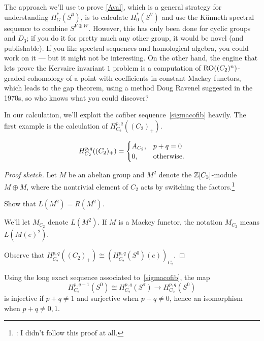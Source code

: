 The approach we'll use to prove \cref{Aval}, which is a general strategy for understanding $H_G^*(S^0)$, is to
calculate $H_0^*(S^V)$ and use the Künneth spectral sequence to combine
$S^{V\oplus W}$. However, this has only been done for cyclic groups and $D_3$; if you do it for pretty much any
other group, it would be novel (and publishable). If you like spectral sequences and homological algebra, you could
work on it --- but it might not be interesting. On the other hand, the engine that lets \cite{HHR} prove the
Kervaire invariant $1$ problem is a computation of $\mathrm{RO}((C_2)^n)$-graded cohomology of a point with coefficients in
constant Mackey functors, which leads to the gap theorem, using a method Doug Ravenel suggested in the 1970s, so
who knows what you could discover?

In our calculation, we'll exploit the cofiber sequence~\eqref{sigmacofib} heavily. The first example is the
calculation of $H_{C_2}^{p,q}((C_2)_+)$.
\begin{prop}
\[H_{C_2}^{p,q}((C_2)_+) = \begin{cases}
	A_{C_2}, &p +q = 0\\
	0, &\text{\rm otherwise.}
\end{cases}\]
\end{prop}
\begin{proof}[Proof sketch]
Let $M$ be an abelian group and $M^2$ denote the $\mathbb Z[C_2]$-module $M\oplus M$, where the nontrivial element of
$C_2$ acts by switching the factors.\footnote{\TODO: I didn't follow this proof at all.}
\begin{ex}
Show that $L(M^2) = R(M^2)$.
\end{ex}
We'll let $M_{C_2}$ denote $L(M^2)$. If $M$ is a Mackey functor, the notation $M_{C_2}$ means $L(M(e)^2)$.

Observe that $\underline H_{C_2}^{p,q}((C_2)_+)\cong (\underline H_{C_2}^{p,q}(S^0)(e))_{C_2}$.
\end{proof}
Using the long exact sequence associated to~\eqref{sigmacofib}, the map
\[H_{C_2}^{p,q-1}(S^0)\cong H_{C_2}^{p,q}(S^\sigma)\longrightarrow H_{C_2}^{p,q}(S^0)\]
is injective if $p+q\ne 1$ and surjective when $p+q\ne 0$, hence an isomorphism when $p+q\ne 0,1$.


